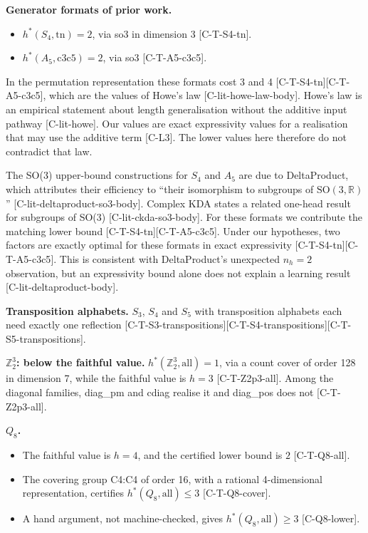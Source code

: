 \documentclass[10pt,twocolumn,a4paper]{article}
\providecommand{\tightlist}{\setlength{\itemsep}{0pt}\setlength{\parskip}{0pt}}
\begin{document}
\textbf{Generator formats of prior work.}

\begin{itemize}
\tightlist
\item
  \(h^*(S_4,\text{tn}) = 2\), via so3 in dimension 3 {[}C-T-S4-tn{]}.
\item
  \(h^*(A_5,\text{c3c5}) = 2\), via so3 {[}C-T-A5-c3c5{]}.
\end{itemize}

In the permutation representation these formats cost 3 and 4 {[}C-T-S4-tn{]}{[}C-T-A5-c3c5{]}, which are the values of Howe's law {[}C-lit-howe-law-body{]}. Howe's law is an empirical statement about length generalisation without the additive input pathway {[}C-lit-howe{]}. Our values are exact expressivity values for a realisation that may use the additive term {[}C-L3{]}. The lower values here therefore do not contradict that law.

The SO(3) upper-bound constructions for \(S_4\) and \(A_5\) are due to DeltaProduct, which attributes their efficiency to ``their isomorphism to subgroups of \(\mathrm{SO}(3,\mathbb{R})\)'' {[}C-lit-deltaproduct-so3-body{]}. Complex KDA states a related one-head result for subgroups of SO(3) {[}C-lit-ckda-so3-body{]}. For these formats we contribute the matching lower bound {[}C-T-S4-tn{]}{[}C-T-A5-c3c5{]}. Under our hypotheses, two factors are exactly optimal for these formats in exact expressivity {[}C-T-S4-tn{]}{[}C-T-A5-c3c5{]}. This is consistent with DeltaProduct's unexpected \(n_h = 2\) observation, but an expressivity bound alone does not explain a learning result {[}C-lit-deltaproduct-body{]}.

\textbf{Transposition alphabets.} \(S_3\), \(S_4\) and \(S_5\) with transposition alphabets each need exactly one reflection {[}C-T-S3-transpositions{]}{[}C-T-S4-transpositions{]}{[}C-T-S5-transpositions{]}.

\textbf{\(\mathbb{Z}_2^3\): below the faithful value.} \(h^*(\mathbb{Z}_2^3,\text{all}) = 1\), via a count cover of order 128 in dimension 7, while the faithful value is \(h = 3\) {[}C-T-Z2p3-all{]}. Among the diagonal families, diag\_pm and cdiag realise it and diag\_pos does not {[}C-T-Z2p3-all{]}.

\textbf{\(Q_8\).}

\begin{itemize}
\tightlist
\item
  The faithful value is \(h = 4\), and the certified lower bound is \(2\) {[}C-T-Q8-all{]}.
\item
  The covering group C4:C4 of order 16, with a rational 4-dimensional representation, certifies \(h^*(Q_8,\text{all}) \le 3\) {[}C-T-Q8-cover{]}.
\item
  A hand argument, not machine-checked, gives \(h^*(Q_8,\text{all}) \ge 3\) {[}C-Q8-lower{]}.
\end{itemize}
\end{document}
